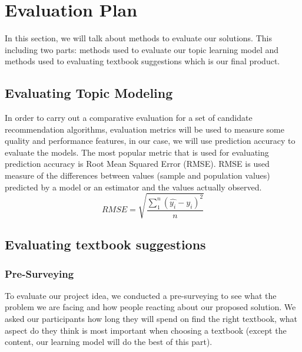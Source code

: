 
\section{Evaluation Plan}
In this section, we will talk about methods to evaluate our solutions. This including two parts: methods used to evaluate our topic learning model and methods used to evaluating textbook suggestions which is our final product. 

\subsection{Evaluating Topic Modeling}
In order to carry out a comparative evaluation for a set of candidate recommendation algorithms, evaluation metrics will be used to measure some quality and performance features, in our case, we will use prediction accuracy to evaluate the models. The most popular metric that is used for evaluating prediction accuracy is Root Mean Squared Error (RMSE). RMSE is used measure of the differences between values (sample and population values) predicted by a model or an estimator and the values actually observed.
\newline
\begin{equation}
   RMSE = \sqrt{\frac{\sum_{1}^{n}\left ( \widehat{y_i}-y_i \right )^{2}}{n}}
\end{equation}
   
\subsection{Evaluating textbook suggestions}
\subsubsection{Pre-Surveying}
To evaluate our project idea, we conducted a pre-surveying to see what the problem we are facing and how people reacting about our proposed solution. We asked our participants how long they will spend on find the right textbook, what aspect do they think is most important when choosing a textbook (except the content, our learning model will do the best of this part).

